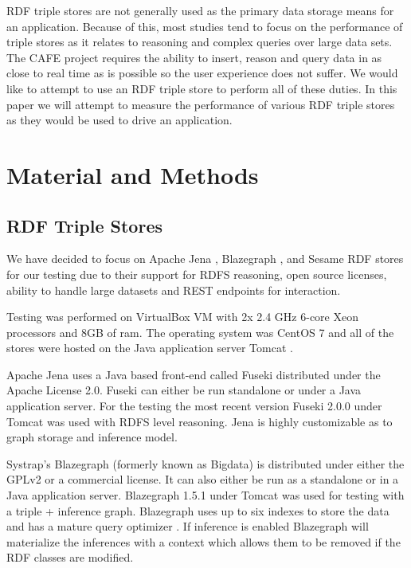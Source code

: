 \documentclass{llncs}
\begin{document}
RDF triple stores are not generally used as the primary data storage means for an application.  Because of this, most studies tend to focus on the performance of triple stores as it relates to reasoning and complex queries over large data sets.  The CAFE project requires the ability to insert, reason and query data in as close to real time as is possible so the user experience does not suffer.  We would like to attempt to use an RDF triple store to perform all of these duties.  In this paper we will attempt to measure the performance of various RDF triple stores as they would be used to drive an application.

\section{Material and Methods}
\subsection{RDF Triple Stores}

We have decided to focus on Apache Jena \cite{Jena}, Blazegraph \cite{Blazegraph}, and Sesame \cite{Sesame} RDF stores for our testing due to their support for RDFS reasoning, open source licenses, ability to handle large datasets and REST endpoints for interaction. \cite{Voigt2012}

Testing was performed on VirtualBox VM \cite{Virtualbox} with 2x 2.4 GHz 6-core Xeon processors and 8GB of ram.  The operating system was CentOS 7 \cite{Centos} and all of the stores were hosted on the Java application server Tomcat \cite{Tomcat}.

Apache Jena uses a Java based front-end called Fuseki distributed under the Apache License 2.0.  Fuseki can either be run standalone or under a Java application server.  For the testing the most recent version Fuseki 2.0.0 under Tomcat was used with RDFS level reasoning.  Jena is highly customizable as to graph storage and inference model.

Systrap's Blazegraph (formerly known as Bigdata) is distributed under either the GPLv2 or a commercial license.  It can also either be run as a standalone or in a Java application server.  Blazegraph 1.5.1 under Tomcat was used for testing with a triple + inference graph.  Blazegraph uses up to six indexes to store the data and has a mature query optimizer \cite{RDFDatabaseSystems}.  If inference is enabled Blazegraph will materialize the inferences with a context which allows them to be removed if the RDF classes are modified.
\end{document}
